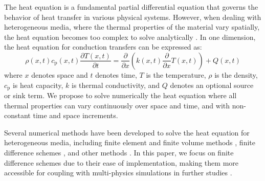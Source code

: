 \documentclass[sn-vancouver, Numbered]{sn-jnl}
\begin{document}
The heat equation is a fundamental partial differential equation that governs the behavior of heat transfer in various physical systems. However, when dealing with heterogeneous media, where the thermal properties of the material vary spatially, the heat equation becomes too complex to solve analytically \cite{Jaeger1950, Loeb2019}. In one dimension, the heat equation for conduction transfers can be expressed as:
\begin{equation}
    \rho(x, t) c_{\mathrm{p}}(x, t) \dfrac{\partial T(x, t)}{\partial t} =  \dfrac{\partial}{\partial x} \left( k(x, t) \dfrac{\partial}{\partial x} T(x, t) \right)
    +  Q(x, t)
    \label{eq:heat-equation}
\end{equation}
where $x$ denotes space and $t$ denotes time, $T$ is the temperature, $\rho$ is the density, $c_{\mathrm{p}}$ is heat capacity, $k$ is thermal conductivity, and $Q$ denotes an optional source or sink term.
We propose to solve numerically the heat equation where all thermal properties can vary continuously over space and time, and with non-constant time and space increments.

Several numerical methods have been developed to solve the heat equation for heterogeneous media, including finite element and finite volume methods \cite{Roubicek1990, Lage1996, Nissen2017, Loeb2019, Masson2020}, finite difference schemes \cite{Spencer1989, Schorghofer2010}, and other methods \cite{Fudym2002, Fang2009}. 
In this paper, we focus on finite difference schemes due to their ease of implementation, making them more accessible for coupling with multi-physics simulations in further studies \cite{Langtangen2017}.
\end{document}
